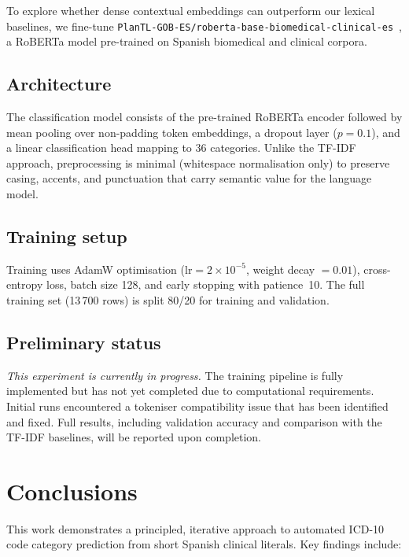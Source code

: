 \documentclass{article}
\begin{document}
To explore whether dense contextual embeddings can outperform our lexical baselines, we fine-tune \texttt{PlanTL-GOB-ES/roberta-base-biomedical-clinical-es}~\cite{PlanTL2022}, a RoBERTa model pre-trained on Spanish biomedical and clinical corpora.

\subsection{Architecture}
\label{ssec:architecture}

The classification model consists of the pre-trained RoBERTa encoder followed by mean pooling over non-padding token embeddings, a dropout layer ($p=0.1$), and a linear classification head mapping to 36 categories. Unlike the TF-IDF approach, preprocessing is minimal (whitespace normalisation only) to preserve casing, accents, and punctuation that carry semantic value for the language model.

\subsection{Training setup}
\label{ssec:training}

Training uses AdamW optimisation ($\text{lr}=2\times10^{-5}$, weight decay $=0.01$), cross-entropy loss, batch size 128, and early stopping with patience~10. The full training set (13\,700 rows) is split 80/20 for training and validation.

\subsection{Preliminary status}
\label{ssec:dl_status}

\textit{This experiment is currently in progress.} The training pipeline is fully implemented but has not yet completed due to computational requirements. Initial runs encountered a tokeniser compatibility issue that has been identified and fixed. Full results, including validation accuracy and comparison with the TF-IDF baselines, will be reported upon completion.

\section{Conclusions}
\label{sec:conclusions}

This work demonstrates a principled, iterative approach to automated ICD-10 code category prediction from short Spanish clinical literals. Key findings include:
\end{document}
